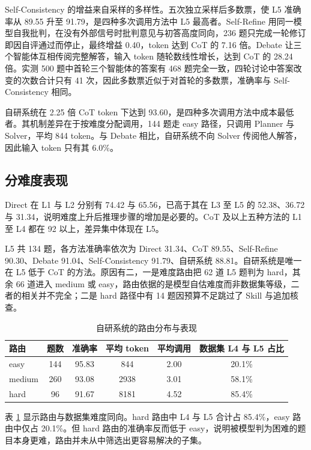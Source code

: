 \documentclass[12pt]{ctexart}
\begin{document}
Self-Consistency 的增益来自采样的多样性。五次独立采样后多数票，使 L5 准确率从 89.55 升至 91.79，是四种多次调用方法中 L5 最高者。Self-Refine 用同一模型自我批判，在没有外部信号时批判意见与初答高度同向，236 题只完成一轮修订即因自评通过而停止，最终增益 0.40，token 达到 CoT 的 7.16 倍。Debate 让三个智能体互相传阅完整解答，输入 token 随轮数线性增长，达到 CoT 的 28.24 倍。实测 500 题中首轮三个智能体的答案有 468 题完全一致，四轮讨论中答案改变的次数合计只有 41 次，因此多数票近似于对首轮的多数票，准确率与 Self-Consistency 相同。

自研系统在 2.25 倍 CoT token 下达到 93.60，是四种多次调用方法中成本最低者。其机制差异在于按难度分配调用，144 题走 easy 路径，只调用 Planner 与 Solver，平均 844 token。与 Debate 相比，自研系统不向 Solver 传阅他人解答，因此输入 token 只有其 6.0\%。

\subsection{分难度表现}

Direct 在 L1 与 L2 分别有 74.42 与 65.56，已高于其在 L3 至 L5 的 52.38、36.72 与 31.34，说明难度上升后推理步骤的增加是必要的。CoT 及以上五种方法的 L1 至 L4 都在 92 以上，差异集中体现在 L5。

L5 共 134 题，各方法准确率依次为 Direct 31.34、CoT 89.55、Self-Refine 90.30、Debate 91.04、Self-Consistency 91.79、自研系统 88.81。自研系统是唯一在 L5 低于 CoT 的方法。原因有二，一是难度路由把 62 道 L5 题判为 hard，其余 66 道进入 medium 或 easy，路由依据的是模型自估难度而非数据集等级，二者的相关并不完全；二是 hard 路径中有 14 题因预算不足跳过了 Skill 与追加核查。

\begin{table}[H]
  \centering
  \caption{自研系统的路由分布与表现}
  \label{tab:route}
  \begin{tabular}{lccccc}
    \toprule
    路由 & 题数 & 准确率 & 平均 token & 平均调用 & 数据集 L4 与 L5 占比 \\
    \midrule
    easy & 144 & 95.83 & 844 & 2.00 & 20.1\% \\
    medium & 260 & 93.08 & 2938 & 3.01 & 58.1\% \\
    hard & 96 & 91.67 & 8181 & 4.52 & 85.4\% \\
    \bottomrule
  \end{tabular}
\end{table}

表 \ref{tab:route} 显示路由与数据集难度同向。hard 路由中 L4 与 L5 合计占 85.4\%，easy 路由中仅占 20.1\%。但 hard 路由的准确率反而低于 easy，说明被模型判为困难的题目本身更难，路由并未从中筛选出更容易解决的子集。
\end{document}
